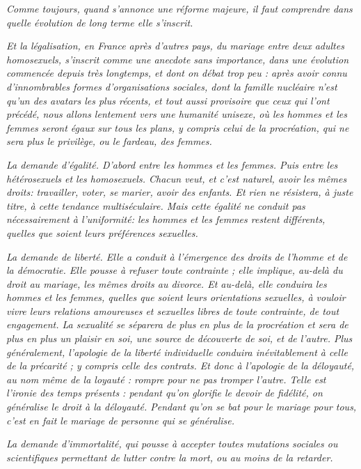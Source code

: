 \begin{displayquote}

\emph{Comme toujours, quand s'annonce une réforme majeure, il faut comprendre dans quelle évolution de long terme elle s'inscrit.}
 
\emph{Et la légalisation, en France après d'autres pays, du mariage entre deux adultes homosexuels, s'inscrit comme une anecdote sans importance, dans une évolution commencée depuis très longtemps, et dont on débat trop peu : après avoir connu d'innombrables formes d'organisations sociales, dont la famille nucléaire n'est qu'un des avatars les plus récents, et tout aussi provisoire que ceux qui l'ont précédé, nous allons lentement vers une humanité unisexe, où les hommes et les femmes seront égaux sur tous les plans, y compris celui de la procréation, qui ne sera plus le privilège, ou le fardeau, des femmes.} 
 
\emph{\primo La demande d'égalité. D'abord entre les hommes et les femmes. Puis entre les hétérosexuels et les homosexuels. Chacun veut, et c'est naturel, avoir les mêmes droits: travailler, voter, se marier, avoir des enfants. Et rien ne résistera, à juste titre, à cette tendance multiséculaire. Mais cette égalité ne conduit pas nécessairement à l'uniformité: les hommes et les femmes restent différents, quelles que soient leurs préférences sexuelles.}
 
\emph{\secundo La demande de liberté. Elle a conduit à l'émergence des droits de l'homme et de la démocratie. Elle pousse à refuser toute contrainte ; elle implique, au-delà du droit au mariage, les mêmes droits au divorce. Et au-delà, elle conduira les hommes et les femmes, quelles que soient leurs orientations sexuelles, à vouloir vivre leurs relations amoureuses et sexuelles libres de toute contrainte, de tout engagement. La sexualité se séparera de plus en plus de la procréation et sera de plus en plus un plaisir en soi, une source de découverte de soi, et de l'autre. Plus généralement, l'apologie de la liberté individuelle conduira inévitablement à celle de la précarité ; y compris celle des contrats. Et donc à l'apologie de la déloyauté, au nom même de la loyauté : rompre pour ne pas tromper l'autre. Telle est l'ironie des temps présents : pendant qu'on glorifie le devoir de fidélité, on généralise le droit à la déloyauté. Pendant qu'on se bat pour le mariage pour tous, c'est en fait le mariage de personne qui se généralise.}
 
\emph{\tertio La demande d'immortalité, qui pousse à accepter toutes mutations sociales ou scientifiques permettant de lutter contre la mort, ou au moins de la retarder.}
 

\end{displayquote}
